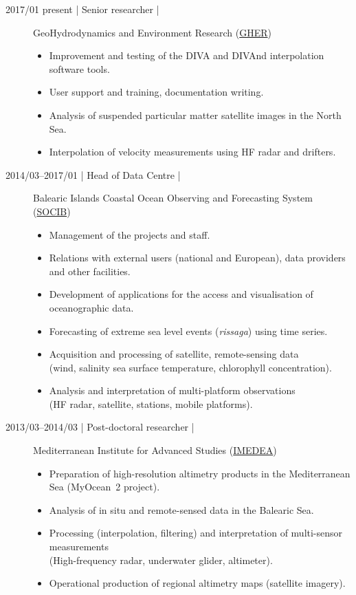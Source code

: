 \documentclass[11pt,a4paper,svgnames]{article}
\begin{document}
\begin{description}
\item[2017/01 present | Senior researcher |] GeoHydrodynamics and Environment Research (\href{http://modb.oce.ulg.ac.be/}{GHER})

\begin{itemize}%
\item Improvement and testing of the DIVA and DIVAnd interpolation software tools.
\item User support and training, documentation writing.
\item Analysis of suspended particular matter satellite images in the North Sea.
\item Interpolation of velocity measurements using HF radar and drifters.
\end{itemize}


\item[2014/03--2017/01 | Head of Data Centre |] Balearic Islands Coastal Ocean Observing and Forecasting System (\href{http//www.socib.eu}{SOCIB})
\begin{itemize}%
\item Management of the projects and staff.
\item Relations with external users (national and European), data providers and other facilities.
\item Development of applications for the access and visualisation of oceanographic data.
\item Forecasting of extreme sea level events (\textit{rissaga}) using time series.
\item Acquisition and processing of satellite, remote-sensing data\\(wind, salinity sea surface temperature, chlorophyll concentration).
\item Analysis and interpretation of multi-platform observations\\(HF radar, satellite, stations, mobile platforms).
\end{itemize}


\item[2013/03--2014/03 | Post-doctoral researcher |] Mediterranean Institute for Advanced Studies (\href{http://imedea.uib-csic.es/}{IMEDEA})
\begin{itemize}%
\item Preparation of high-resolution altimetry products in the Mediterranean Sea (MyOcean~2 project).
\item Analysis of in situ and remote-sensed data in the Balearic Sea.
\item Processing (interpolation, filtering) and interpretation of multi-sensor measurements\\(High-frequency radar, underwater glider, altimeter).
\item Operational production of regional altimetry maps (satellite imagery).
\end{itemize}



\end{description}
\end{document}
